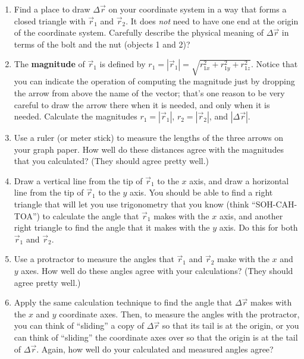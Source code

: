 \documentclass[11pt]{article}
\begin{document}
\begin{enumerate}
\item Find a place to draw  $\Delta\vec{r}$ on your coordinate system 
  in a way that forms a closed triangle with $\vec{r}_1$ and $\vec{r}_2$.
  It does {\em not} need to have one end at the origin of the coordinate 
  system.  Carefully describe the physical meaning of $\Delta\vec{r}$
  in terms of the bolt and the nut (objects 1 and 2)?

\item The {\textbf{magnitude}} of ${\vec{r}_1}$ is defined by 
 $r_1 = \left| \vec{r}_1 \right| = \sqrt{r_{1x}^2 + r_{1y}^2 + r_{1z}^2}$.  Notice that 
 you can indicate the operation of computing the magnitude just by dropping 
 the arrow from above the name of the vector; that's one reason to be very 
 careful to draw the arrow there when it is needed, and only when it is needed.
 Calculate the magnitudes  $r_1 = \left| \vec{r}_1 \right| $, $r_2 = \left| \vec{r}_2 \right|$,
 and $\left| \Delta {\vec r} \right|$.

\item Use a ruler (or meter stick) to measure the lengths of the three arrows 
  on your graph paper.  How well do these distances agree with the magnitudes 
  that you calculated?  (They should agree pretty well.)

\item Draw a vertical line from the tip of ${\vec{r}_1}$ to the $x$ axis, 
  and draw a horizontal line from the tip of  ${\vec{r}_1}$ to the $y$ axis.
  You should be able to find a right triangle that will let you use 
  trigonometry that you know (think ``SOH-CAH-TOA'') to calculate the angle
  that  ${\vec{r}_1}$ makes with the $x$ axis, and another right triangle
  to find the angle that it makes with the $y$ axis.  Do this for both
  ${\vec{r}_1}$ and ${\vec{r}_2}$.

\item Use a protractor to measure the angles that ${\vec{r}_1}$ 
  and ${\vec{r}_2}$ make with the $x$ and $y$ axes.  How well do these
  angles agree with your calculations?  (They should agree pretty well.)

\item Apply the same calculation technique to find the 
  angle that $\Delta {\vec r}$ makes with the $x$ and $y$ coordinate
  axes.   Then, to measure the angles with the protractor, you can think 
  of ``sliding'' a copy of $\Delta {\vec r}$ so that its tail is at the 
  origin, or you can think of ``sliding'' the coordinate axes over so that the 
  origin is at the tail of $\Delta {\vec r}$.  Again, how well do your
  calculated and measured angles agree?


\end{enumerate}
\end{document}
